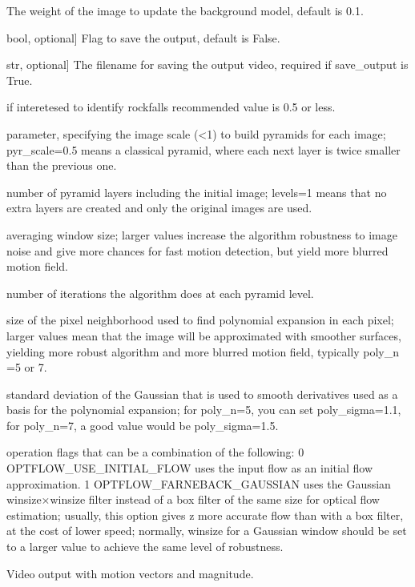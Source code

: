 \documentclass[letterpaper,10pt,english]{sphinxmanual}
\begin{document}
\begin{fulllineitems}
\begin{description}
\sphinxAtStartPar
The weight of the image to update the background model, default is 0.1.

\sphinxlineitem{save\_output}{[}bool, optional{]}
\sphinxAtStartPar
Flag to save the output, default is False.

\sphinxlineitem{output\_filename}{[}str, optional{]}
\sphinxAtStartPar
The filename for saving the output video, required if save\_output is True.

\sphinxAtStartPar
if interetesed to identify rockfalls recommended value is 0.5 or less.

\sphinxAtStartPar
parameter, specifying the image scale (\textless{}1) to build pyramids for each image; pyr\_scale=0.5 means a classical pyramid, where each next layer is twice smaller than the previous one.

\sphinxAtStartPar
number of pyramid layers including the initial image; levels=1 means that no extra layers are created and only the original images are used.

\sphinxAtStartPar
averaging window size; larger values increase the algorithm robustness to image noise and give more chances for fast motion detection, but yield more blurred motion field.

\sphinxAtStartPar
number of iterations the algorithm does at each pyramid level.

\sphinxAtStartPar
size of the pixel neighborhood used to find polynomial expansion in each pixel; 
larger values mean that the image will be approximated with smoother surfaces, 
yielding more robust algorithm and more blurred motion field, typically poly\_n =5 or 7.

\sphinxAtStartPar
standard deviation of the Gaussian that is used to smooth derivatives used as a basis for the polynomial expansion; 
for poly\_n=5, you can set poly\_sigma=1.1, for poly\_n=7, a good value would be poly\_sigma=1.5.

\sphinxAtStartPar
operation flags that can be a combination of the following:
0 OPTFLOW\_USE\_INITIAL\_FLOW uses the input flow as an initial flow approximation.
1 OPTFLOW\_FARNEBACK\_GAUSSIAN uses the Gaussian winsize×winsize filter instead of a box filter of the same size for optical flow estimation; 
usually, this option gives z more accurate flow than with a box filter, at the cost of lower speed; 
normally, winsize for a Gaussian window should be set to a larger value to achieve the same level of robustness.

\sphinxAtStartPar
Video output with motion vectors and magnitude.

\end{description}

\end{fulllineitems}
\end{document}
